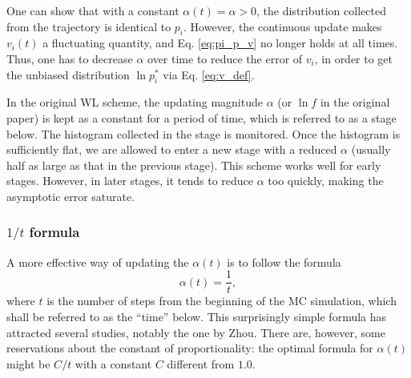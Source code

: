 \documentclass[reprint]{revtex4-1}
\begin{document}



One can show that with a constant $\alpha(t) = \alpha > 0$,
the distribution collected from
the trajectory is identical to $p_i$.
%
However, the continuous update
makes $v_i(t)$ a fluctuating quantity,
and Eq. \eqref{eq:pi_p_v} no longer holds
at all times.
%
Thus, one has to decrease $\alpha$ over time
to reduce the error of $v_i$,
in order to get the unbiased distribution
$\ln p_i^*$ via Eq. \eqref{eq:v_def}.





In the original WL scheme,
the updating magnitude $\alpha$ (or $\ln f$
in the original paper) is kept as a constant
for a period of time,
which is referred to as a stage below.
%
The histogram collected in the stage is monitored.
%
Once the histogram is sufficiently flat,
we are allowed to enter a new stage
with a reduced $\alpha$
(usually half as large as
that in the previous stage).
%
This scheme works well for early stages.
%
However, in later stages, it tends to reduce $\alpha$
too quickly, making the asymptotic error
saturate.



\subsubsection{$1/t$ formula}



A more effective way
of updating the $\alpha(t)$
is to follow the formula
%
\begin{equation}
  \alpha(t) = \frac{1}{t},
  \label{eq:alpha_invt}
\end{equation}
%
where $t$ is the number of steps
from the beginning of the MC simulation,
which shall be referred to as the ``time'' below.
%
This surprisingly simple formula has attracted
several studies, notably the one by Zhou.
%
There are, however, some reservations about
the constant of proportionality:
the optimal formula for $\alpha(t)$
might be $C/t$ with a constant $C$
different from $1.0$.
\end{document}
